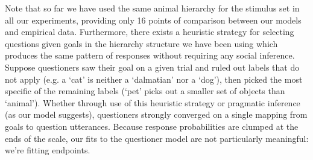 \documentclass[12pt, floatsintext, jou]{apa6}
\begin{document}
Note that so far we have used the same animal hierarchy for the stimulus set in all our experiments, providing only 16 points of comparison between our models and empirical data. Furthermore, there exists a heuristic strategy for selecting questions given goals in the hierarchy structure we have been using which produces the same pattern of responses without requiring any social inference. Suppose questioners saw their goal on a given trial and ruled out labels that do not apply (e.g. a `cat' is neither a `dalmatian' nor a `dog'), then picked the most specific of the remaining labels (`pet' picks out a smaller set of objects than `animal'). Whether through use of this heuristic strategy or pragmatic inference (as our model suggests), questioners strongly converged on a single mapping from goals to question utterances. Because response probabilities are clumped at the ends of the scale, our fits to the questioner model are not particularly meaningful: we're fitting endpoints.
 
\end{document}
